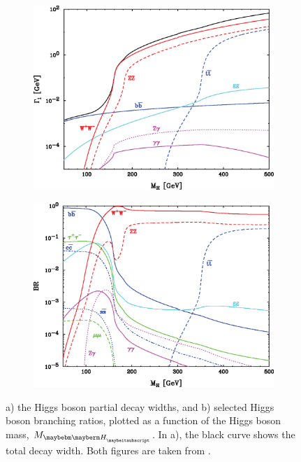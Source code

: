\begin{figure}[tbph]
\centering
    \begin{subfigure}[b]{0.45\textwidth}
        \includegraphics[width=\textwidth]{theory/HiggsDecayWidth}
        \caption{}
        \label{fig:theoryHiggsDecayWidth}
    \end{subfigure}
    \begin{subfigure}[b]{0.45\textwidth}
        \includegraphics[width=\textwidth]{theory/HiggsBranchingRatio}
        \caption{}
        \label{fig:theoryHiggsBranchingRatio}
    \end{subfigure}
\caption[SM Higgs boson decay width and branching ratios]%
{a) the Higgs boson partial decay widths, and b) selected Higgs boson branching ratios, plotted as a function of the Higgs boson mass, $M_{\PH}$. In a), the black curve shows the total decay width. Both figures are taken from \cite{Rainwater:2007cp}.}
\label{fig:theoryHiggsPhenomenology}
\end{figure}


